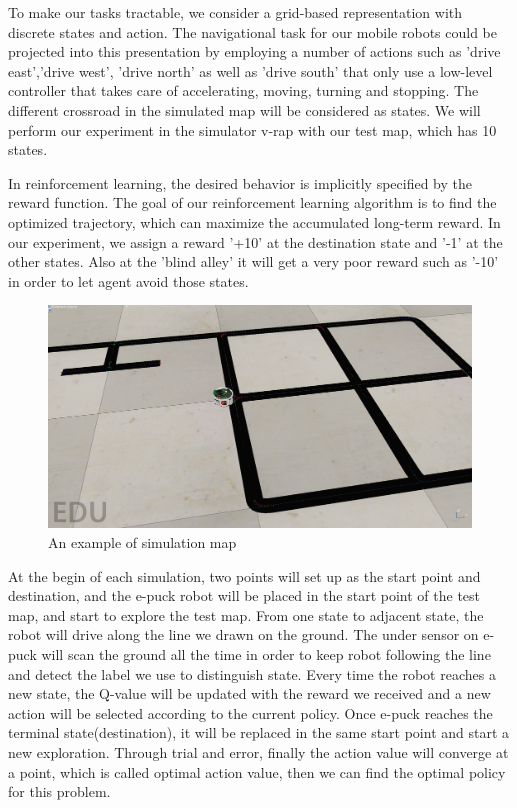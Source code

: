 \documentclass[a4paper, 11pt]{article} %
\begin{document}
To make our tasks tractable, we consider a grid-based representation with discrete states and action. The navigational task for our mobile robots could be projected into this presentation by employing a number of actions such as 'drive east','drive west', 'drive north' as well as 'drive south' that only use a low-level controller that takes care of accelerating, moving, turning and stopping. The different crossroad in the simulated map will be considered as states. We will perform our experiment in the simulator v-rap with our test map, which has 10 states.

In reinforcement learning, the desired behavior is implicitly specified by the reward function. The goal of our reinforcement learning algorithm is to find the optimized trajectory, which can maximize the accumulated long-term reward. In our experiment, we assign a reward '+10' at the destination state and '-1' at the other states. Also at the 'blind alley' it will get a very
poor reward such as '-10' in order to let agent avoid those states.
\begin{figure}[tb]
\centering 
\includegraphics[width=0.9\columnwidth]{simulatemap} 
\caption[An example of a floating figure]{An example of simulation map} %
\label{fig:gallery} 
\end{figure}
At the begin of each simulation, two points will set up as the start point and destination, and the e-puck robot will be placed in the start point of the test map, and start to explore the test map. From one state to adjacent state, the robot will drive along the line we drawn on the ground. The under sensor on e-puck will scan the ground all the time in order to keep robot following the line and detect the label we use to distinguish state. Every time the robot reaches a new state, the Q-value will be updated with the reward we received and a new action will be selected according to the current policy. Once e-puck reaches the terminal state(destination), it will be replaced in the same start point and start a new exploration. Through trial and error, finally the action value will converge at a point, which is called optimal action value, then we can find the optimal policy for this problem.
\end{document}
